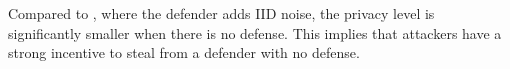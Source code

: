     Compared to , where the defender adds IID noise, the privacy level is significantly smaller when there is no defense. This implies that attackers have a strong incentive to steal from a defender with no defense. 

